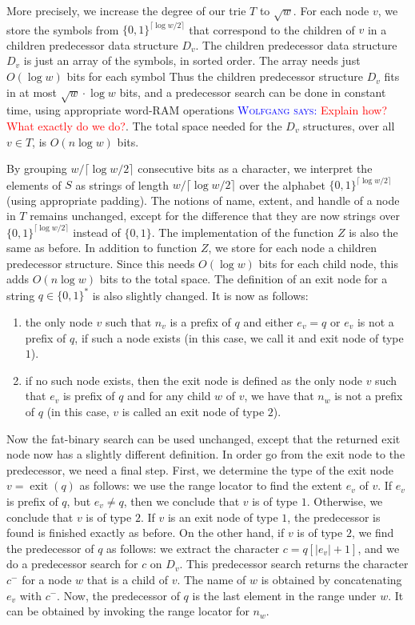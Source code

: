 \documentclass[a4paper,11pt]{article}
\newcommand{\?}{\mskip1.5mu}
\DeclareMathOperator{\exit}{exit}
\newcommand{\aremark}[3]{\textcolor{blue}{\textsc{#1 #2:}}
  \textcolor{red}{\textsf{#3}}}
\newcommand{\wolfgang}[2][says]{\aremark{Wolfgang}{#1}{#2}}
\begin{document}
More precisely, we increase the degree of our trie $T$ 
to $\sqrt{w}$. For each node 
$v$, we store the symbols from $\{0, 1\}^{\lceil \log w / 2 \rceil}$
that correspond to the children of $v$
in a children predecessor data 
structure $D_v$. 
The children predecessor data structure 
$D_v$ is just an array of the symbols, in sorted order. 
The array needs just $O(\log w)$ bits for each symbol
Thus the children predecessor structure $D_v$ fits in at most 
$\sqrt{w} \cdot {\log w}$ bits, and a predecessor search can 
be done in constant time, using appropriate word-RAM operations
\wolfgang{Explain how? What exactly do we do?}. 
The total space needed for the $D_v$ structures, over all $v \in T$,
is $O(n\log w)$ bits. 

By grouping
$w/\lceil\log w/2\rceil$ consecutive 
bits as a character, we interpret the 
elements of $S$ as strings of length $w/\lceil\log w/2\rceil$ 
over the alphabet $\{0, 1\}^{\lceil \log w / 2 \rceil}$ (using
appropriate padding).
The notions of name, 
extent, and handle of a node in $T$ remains unchanged, except for 
the difference that they are now strings over 
$\{0, 1\}^{\lceil\log w/2\rceil}$ instead of $\{0,1\}$. 
The implementation of the function $Z$ is also the same as before. 
In addition to function $Z$, we store for each node a children
predecessor structure. Since this needs $O(\log w)$ bits for each
child node, this adds 
$O(n\log w)$ bits to the total space. 
The definition of an exit node for a string $q \in \{0, 1\}^*$ 
is also slightly changed. 
It is now as follows:
\begin{enumerate}
\item the only node $v$ such that $n_v$ is a prefix of $q$ and 
either $e_v = q$ or $e_v$ is not a prefix of $q$, 
if such a node exists (in this case, we call it 
and exit node of type $1$). 
\item if no such node exists, then the exit node 
is defined as the only node $v$ such that $e_v$ is prefix of 
$q$ and for any child $w$ of $v$, we have that $n_w$ is not a prefix of 
$q$ (in this case, $v$ is called an exit node of type $2$). 
\end{enumerate}

Now the fat-binary search can be used unchanged, 
except that the returned exit node now has a slightly 
different definition. In order go from the exit node
to the predecessor, we need a final step. 
First, we determine the type of the exit node 
$v = \exit(q)$ as follows: we use the range locator to 
find the extent $e_v$ of $v$. If $e_v$ is prefix of $q$, but 
$e_v \neq q$, then we conclude that $v$ is of type $1$. 
Otherwise, we conclude that $v$ is of type $2$. 
If $v$ is an exit node of type $1$, the predecessor is found 
is finished exactly as before. On the other hand, 
if $v$  is of type $2$, we find the predecessor of $q$ as follows: we 
extract the character $c = q[|e_v| + 1]$, and we do a predecessor 
search for $c$ on $D_v$. This predecessor search returns the 
character $c^-$ for a node $w$ that is a child of $v$. The name of $w$ is
obtained by concatenating $e_v$ with $c^-$. Now, the predecessor 
of $q$ is the last element in the range under $w$. It 
can be obtained by invoking the range locator for $n_w$. 
\end{document}
